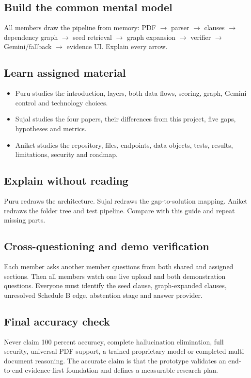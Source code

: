 \documentclass[11pt,letterpaper]{article}
\begin{document}
\subsection{Build the common mental model}
All members draw the pipeline from memory: PDF $\rightarrow$ parser $\rightarrow$ clauses $\rightarrow$ dependency graph $\rightarrow$ seed retrieval $\rightarrow$ graph expansion $\rightarrow$ verifier $\rightarrow$ Gemini/fallback $\rightarrow$ evidence UI. Explain every arrow.

\subsection{Learn assigned material}
\begin{itemize}
  \item Puru studies the introduction, layers, both data flows, scoring, graph, Gemini control and technology choices.
  \item Sujal studies the four papers, their differences from this project, five gaps, hypotheses and metrics.
  \item Aniket studies the repository, files, endpoints, data objects, tests, results, limitations, security and roadmap.
\end{itemize}

\subsection{Explain without reading}
Puru redraws the architecture. Sujal redraws the gap-to-solution mapping. Aniket redraws the folder tree and test pipeline. Compare with this guide and repeat missing parts.

\subsection{Cross-questioning and demo verification}
Each member asks another member questions from both shared and assigned sections. Then all members watch one live upload and both demonstration questions. Everyone must identify the seed clause, graph-expanded clauses, unresolved Schedule B edge, abstention stage and answer provider.

\subsection{Final accuracy check}
Never claim 100 percent accuracy, complete hallucination elimination, full security, universal PDF support, a trained proprietary model or completed multi-document reasoning. The accurate claim is that the prototype validates an end-to-end evidence-first foundation and defines a measurable research plan.
\end{document}
